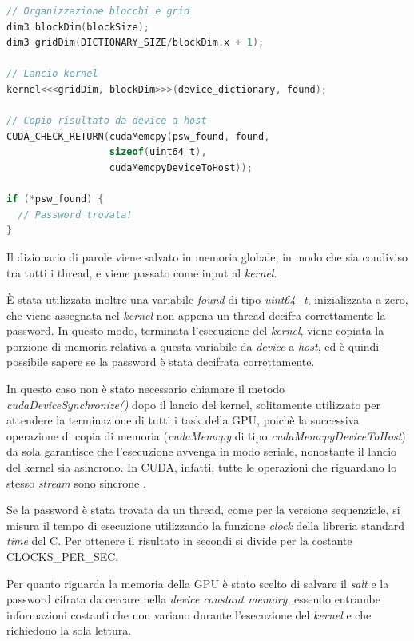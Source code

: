\documentclass[10pt,twocolumn,letterpaper]{article}
\begin{document}
\begin{lstlisting}[basicstyle=\scriptsize, language=C, frame=single, caption={Esempio di lancio del kernel in CUDA},captionpos=b]
// Organizzazione blocchi e grid
dim3 blockDim(blockSize);
dim3 gridDim(DICTIONARY_SIZE/blockDim.x + 1);

// Lancio kernel
kernel<<<gridDim, blockDim>>>(device_dictionary, found);

// Copio risultato da device a host
CUDA_CHECK_RETURN(cudaMemcpy(psw_found, found, 
                  sizeof(uint64_t), 
                  cudaMemcpyDeviceToHost));
                  
if (*psw_found) {
  // Password trovata!
}
\end{lstlisting}

Il dizionario di parole viene salvato in memoria globale, in modo che sia condiviso tra tutti i thread, e viene passato come input al \textit{kernel}.

È stata utilizzata inoltre una variabile \textit{found} di tipo \textit{uint64\_t}, inizializzata a zero, che viene assegnata nel \textit{kernel} non appena un thread decifra correttamente la password. In questo modo, terminata l'esecuzione del \textit{kernel}, viene copiata la porzione di memoria relativa a questa variabile da \textit{device} a \textit{host}, ed è quindi possibile sapere se la password è stata decifrata correttamente.

In questo caso non è stato necessario chiamare il metodo \textit{cudaDeviceSynchronize()} dopo il lancio del kernel, solitamente utilizzato per attendere la terminazione di tutti i task della GPU, poichè la successiva operazione di copia di memoria (\textit{cudaMemcpy} di tipo \textit{cudaMemcpyDeviceToHost}) da sola garantisce che l'esecuzione avvenga in modo seriale, nonostante il lancio del kernel sia asincrono. 
In CUDA, infatti, tutte le operazioni che riguardano lo stesso \textit{stream} sono sincrone \cite{CUDA_SYNC}.

Se la password è stata trovata da un thread, come per la versione sequenziale, si misura il tempo di esecuzione utilizzando la funzione \textit{clock} della libreria standard \textit{time} del C. Per ottenere il risultato in secondi si divide per la costante CLOCKS\_PER\_SEC.\newline

Per quanto riguarda la memoria della GPU è stato scelto di salvare il \textit{salt} e la password cifrata da cercare nella \textit{device constant memory}, essendo entrambe informazioni costanti che non variano durante l'esecuzione del \textit{kernel} e che richiedono la sola lettura.
\end{document}
